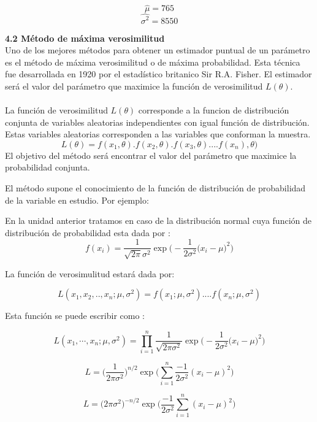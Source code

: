 \documentclass[base=hide,11pt]{elegantbook}
\begin{document}
{$$\widehat{\mu}=765$$  
$$\widehat{\sigma^{2}}=8550$$

\vspace{1cm}			
\textcolor{col4}{\bf \LARGE  4.2 Método de máxima verosimilitud}\\
			
Uno de los mejores métodos para obtener un estimador puntual de un parámetro es el método de máxima verosimilitud o de máxima probabilidad. Esta técnica fue desarrollada en 1920 por el estadístico britanico Sir R.A. Fisher. El estimador será el valor del parámetro que maximice la función de verosimilitud $L(\theta)$. \\ \\
			
La función de verosimilitud $L(\theta)$ corresponde a la funcion de distribución conjunta de variables aleatorias independientes con igual función de distribución. Estas variables aleatorias corresponden a las variables que conforman la muestra.
$$L(\theta)=f(x_{1},\theta).f(x_{2},\theta).f(x_{3},\theta)....f(x_{n}),\theta)$$
El objetivo del método será encontrar el valor del parámetro que maximice la probabilidad conjunta.
			
El método supone el conocimiento de la función de distribución de probabilidad de la variable en estudio. Por ejemplo:
			
En la unidad anterior tratamos en caso de la distribución normal cuya función de distribución de probabilidad esta dada por :
$$f(x_{i})=\frac{1}{\sqrt{2\pi}\sigma^{2}} \exp{\Bigg(-\frac{1}{2\sigma^{2}}\big(x_{i}-\mu\big)^{2}\Bigg)}$$

La función de verosimulitud estará dada por:
			
$$L(x_{1},x_{2},..,x_{n};\mu,\sigma^{2})=f(x_{1};\mu,\sigma^{2})....f(x_{n};\mu,\sigma^{2})$$

Esta función se puede escribir como :

$$L(x_{1},\cdots,x_{n};\mu,\sigma^{2})=\displaystyle\prod_{i=1}^{n} \frac{1}{\sqrt{2\pi\sigma^{2}}}\exp{\Bigg(-\frac{1}{2\sigma^{2}}\big(x_{i}-\mu\big)^{2}\Bigg)} $$
			
$$L=\displaystyle\Big(\frac{1}{2\pi \sigma^{2}}\Big)^{n/2} \exp \Bigg(\sum_{i=1}^{n}\frac{-1}{2\sigma^{2}}(x_{i}-\mu)^{2}\Bigg) $$
			
$$L=\displaystyle\Big(2\pi \sigma^{2}\Big)^{-n/2} \exp \Bigg(\frac{-1}{2\sigma^{2}}\sum_{i=1}^{n}(x_{i}-\mu)^{2}\Bigg) $$
			
}
\end{document}
